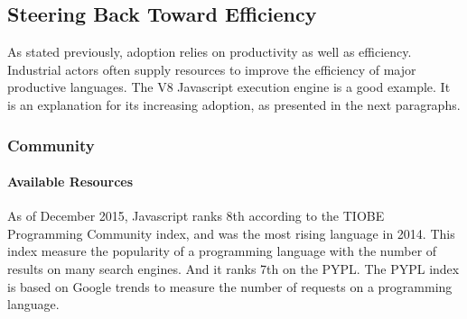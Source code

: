 
\subsection{Steering Back Toward Efficiency} \label{chapter3:software-productivity:adoption}

\begin{figure}[h!]
%
\end{figure}


As stated previously, adoption relies on productivity as well as efficiency.
Industrial actors often supply resources to improve the efficiency of major productive languages.
The V8 Javascript execution engine is a good example.
It is an explanation for its increasing adoption, as presented in the next paragraphs.

\subsubsection{Community}%
\paragraph{Available Resources}%
As of December 2015, Javascript ranks 8th according to the TIOBE Programming Community index, and was the most rising language in 2014.
This index measure the popularity of a programming language with the number of results on many search engines.
And it ranks 7th on the PYPL.
The PYPL index is based on Google trends to measure the number of requests on a programming language.

